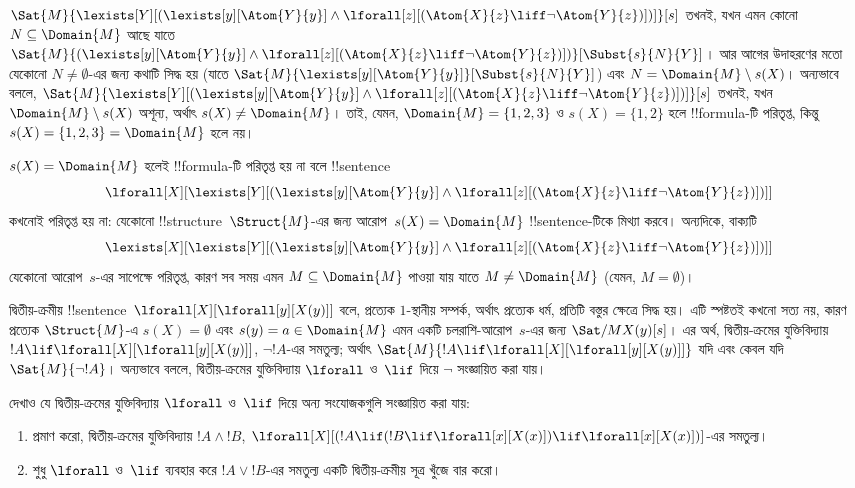 \documentclass[../../../include/open-logic-section]{subfiles}
\begin{document}
\begin{ex}
  $\Sat{M}{\lexists[Y][(\lexists[y][\Atom{Y}{y}] \land
  \lforall[z][(\Atom{X}{z} \liff \lnot \Atom{Y}{z})])]}[s]$ তখনই,
  যখন এমন কোনো $N \subseteq \Domain{M}$ আছে যাতে
  $\Sat{M}{(\lexists[y][\Atom{Y}{y}] \land \lforall[z][(\Atom{X}{z}
  \liff \lnot \Atom{Y}{z})])}[\Subst{s}{N}{Y}]$। আর আগের
  উদাহরণের মতো যেকোনো $N \neq \emptyset$-এর জন্য কথাটি সিদ্ধ হয়
  (যাতে $\Sat{M}{\lexists[y][\Atom{Y}{y}]}[\Subst{s}{N}{Y}]$) এবং
  $N = \Domain{M} \setminus s(X)$। অন্যভাবে বললে,
  $\Sat{M}{\lexists[Y][(\lexists[y][\Atom{Y}{y}] \land
  \lforall[z][(\Atom{X}{z} \liff \lnot \Atom{Y}{z})])]}[s]$ তখনই,
  যখন $\Domain{M} \setminus s(X)$ অশূন্য, অর্থাৎ $s(X) \neq
  \Domain{M}$। তাই, যেমন, $\Domain{M} = \{1, 2, 3\}$ ও $s(X) =
  \{1, 2\}$ হলে !!{formula}-টি পরিতৃপ্ত, কিন্তু $s(X) = \{1, 2, 3\}
  = \Domain{M}$ হলে নয়।

  $s(X) = \Domain{M}$ হলেই !!{formula}-টি পরিতৃপ্ত হয় না বলে
  !!{sentence}
  \[
  \lforall[X][\lexists[Y][(\lexists[y][\Atom{Y}{y}] \land
      \lforall[z][(\Atom{X}{z} \liff \lnot \Atom{Y}{z})])]]
  \]
  কখনোই পরিতৃপ্ত হয় না: যেকোনো !!{structure}~$\Struct{M}$-এর জন্য
  আরোপ~$s(X) = \Domain{M}$ !!{sentence}-টিকে মিথ্যা করবে। অন্যদিকে,
  বাক্যটি
  \[
  \lexists[X][\lexists[Y][(\lexists[y][\Atom{Y}{y}] \land
      \lforall[z][(\Atom{X}{z} \liff \lnot \Atom{Y}{z})])]]
  \]
  যেকোনো আরোপ~$s$-এর সাপেক্ষে পরিতৃপ্ত, কারণ সব সময় এমন
  $M \subseteq \Domain{M}$ পাওয়া যায় যাতে $M \neq \Domain{M}$
  (যেমন, $M = \emptyset$)।
\end{ex}

\begin{ex}
  দ্বিতীয়-ক্রমীয় !!{sentence}~$\lforall[X][\lforall[y][X(y)]]$ বলে,
  প্রত্যেক $1$-স্থানীয় সম্পর্ক, অর্থাৎ প্রত্যেক ধর্ম, প্রতিটি বস্তুর
  ক্ষেত্রে সিদ্ধ হয়। এটি স্পষ্টতই কখনো সত্য নয়, কারণ প্রত্যেক
  $\Struct{M}$-এ $s(X) = \emptyset$ এবং $s(y) = a \in \Domain{M}$ এমন
  একটি চলরাশি-আরোপ~$s$-এর জন্য $\Sat/{M}{X(y)}[s]$। এর অর্থ,
  দ্বিতীয়-ক্রমের যুক্তিবিদ্যায় $!A \lif
  \lforall[X][\lforall[y][X(y)]]$, $\lnot !A$-এর সমতুল্য; অর্থাৎ
  $\Sat{M}{!A \lif \lforall[X][\lforall[y][X(y)]]}$ যদি এবং কেবল যদি
  $\Sat{M}{\lnot !A}$। অন্যভাবে বললে, দ্বিতীয়-ক্রমের যুক্তিবিদ্যায়
  $\lforall$ ও~$\lif$ দিয়ে $\lnot$ সংজ্ঞায়িত করা যায়।
\end{ex}

\begin{prob}
  দেখাও যে দ্বিতীয়-ক্রমের যুক্তিবিদ্যায় $\lforall$ ও~$\lif$ দিয়ে
  অন্য সংযোজকগুলি সংজ্ঞায়িত করা যায়:
  \begin{enumerate}
    \item প্রমাণ করো, দ্বিতীয়-ক্রমের যুক্তিবিদ্যায় $!A \land !B$,
    $\lforall[X][(!A \lif (!B \lif \lforall[x][X(x)])\lif
    \lforall[x][X(x)])]$-এর সমতুল্য।
    \item শুধু $\lforall$ ও~$\lif$ ব্যবহার করে $!A \lor !B$-এর
    সমতুল্য একটি দ্বিতীয়-ক্রমীয় সূত্র খুঁজে বার করো।
  \end{enumerate}
\end{prob}
\end{document}
